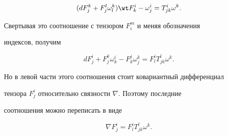 $$ 


(dF^k_j+F^l_j\omega^k_l)\wt F^i_k- 


\omega^i_j=T^i_{jk}\omega^k. 


$$ 


Свертывая это соотношение с тензором $F^m_i$ и меняя обозначения 


индексов, получим 


$$ 


dF^i_j+F^k_j\omega^i_k-F^j_k\omega^k_j= 


F^i_l T^l_{jk}\omega^k. 


$$ 


Но в левой части этого соотношения стоит ковариантный дифференциал 


тензора $F^i_j$ относительно связности $\nabla$. Поэтому последние 


соотношения можно переписать в виде 


\begin{equation} 


\nabla F^i_j=F^i_l T^l_{jk}\omega^k. 


\end{equation} 


 



